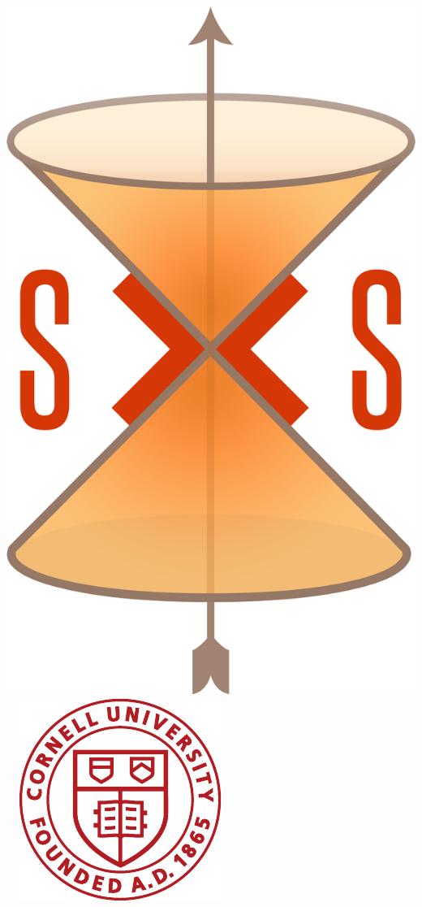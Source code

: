 \documentclass[svgnames,tikz,serif,ragged2e]{beamer}
\begin{document}
{$\;\;\;\;$\includegraphics[height=.2\textheight]{sxs_logo_notext_1549px.png}
$\;\;\;\;$\includegraphics[height=.2\textheight]{CULogo-red120px.pdf}
}
\end{document}
